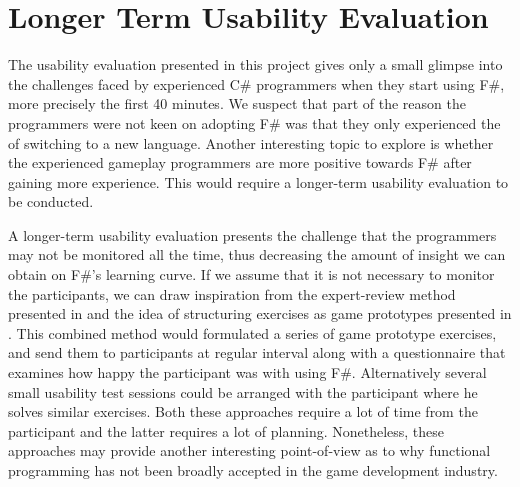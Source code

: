 \section{Longer Term Usability Evaluation}
The usability evaluation presented in this project gives only a small glimpse into the challenges faced by experienced C\# programmers when they start using F\#, more precisely the first 40 minutes. We suspect that part of the reason the programmers were not keen on adopting F\# was that they only experienced the  of switching to a new language. Another interesting topic to explore is whether the experienced gameplay programmers are more positive towards F\# after gaining more experience. This would require a longer-term usability evaluation to be conducted. 

A longer-term usability evaluation presents the challenge that the programmers may not be monitored all the time, thus decreasing the amount of insight we can obtain on F\#'s learning curve. If we assume that it is not necessary to monitor the participants, we can draw inspiration from the expert-review method presented in \cite{nanz2013examining} and the idea of structuring exercises as game prototypes presented in . This combined method would formulated a series of game prototype exercises, and send them to participants at regular interval along with a questionnaire that examines how happy the participant was with using F\#. Alternatively several small usability test sessions could be arranged with the participant where he solves similar exercises. Both these approaches require a lot of time from the participant and the latter requires a lot of planning. Nonetheless, these approaches may provide another interesting point-of-view as to why functional programming has not been broadly accepted in the game development industry.   